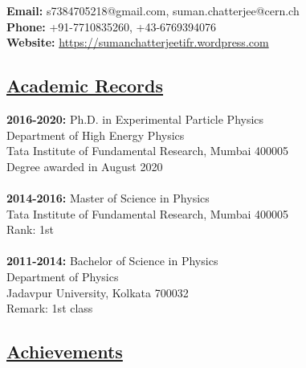 \documentclass[a4paper,11pt]{article}
\begin{document}
\textbf{Email:} s7384705218@gmail.com, suman.chatterjee@cern.ch\\
\textbf{Phone: } +91-7710835260, +43-6769394076\\
\textbf{Website: } \href{https://sumanchatterjeetifr.wordpress.com}{https://sumanchatterjeetifr.wordpress.com}


\subsection*{\underline{Academic Records}}

\textbf{2016-2020:}
Ph.D. in Experimental Particle Physics\\
Department of High Energy Physics\\
Tata Institute of Fundamental Research, Mumbai 400005\\
Degree awarded in August 2020
\\
\\
\textbf{2014-2016:}
Master of Science in Physics\\
Tata Institute of Fundamental Research, Mumbai 400005\\
Rank: 1st
\\
\\
\textbf{2011-2014:}
Bachelor of Science in Physics\\
Department of Physics\\
Jadavpur University, Kolkata  700032\\
Remark: 1st class

\subsection*{\underline{Achievements}}
\end{document}
